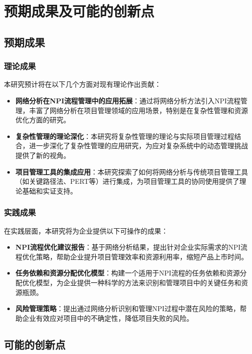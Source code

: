 \chapter{预期成果及可能的创新点}

\section{预期成果}

\subsection{理论成果}
本研究预计将在以下几个方面对现有理论作出贡献：
\begin{itemize}
    \item \textbf{网络分析在NPI流程管理中的应用拓展}：通过将网络分析方法引入NPI流程管理，丰富了网络分析在项目管理领域的应用场景，特别是在复杂性管理和资源优化方面的研究。
    \item \textbf{复杂性管理的理论深化}：本研究将复杂性管理的理论与实际项目管理过程结合，进一步深化了复杂性管理的应用研究，为应对复杂系统中的动态管理挑战提供了新的视角。
    \item \textbf{项目管理工具的集成应用}：本研究探索了如何将网络分析与传统项目管理工具（如关键路径法、PERT等）进行集成，为项目管理工具的协同使用提供了理论基础和实证支持。
\end{itemize}

\subsection{实践成果}
在实践层面，本研究将为企业提供以下可操作的成果：
\begin{itemize}
    \item \textbf{NPI流程优化建议报告}：基于网络分析结果，提出针对企业实际需求的NPI流程优化策略，帮助企业提升项目管理效率和资源利用率，缩短产品上市时间。
    \item \textbf{任务依赖和资源分配优化模型}：构建一个适用于NPI流程的任务依赖和资源分配优化模型，为企业提供一种科学的方法来识别和管理项目中的关键任务和资源瓶颈。
    \item \textbf{风险管理策略}：提出通过网络分析识别和管理NPI过程中潜在风险的策略，帮助企业有效应对项目中的不确定性，降低项目失败的风险。
\end{itemize}

\section{可能的创新点}

